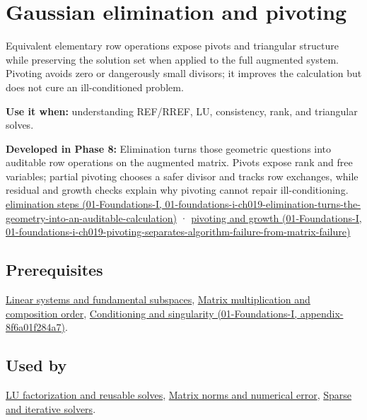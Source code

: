 \hypertarget{appendix-f6e77f4a200f}{}
\section{Gaussian elimination and pivoting}\label{appendix-f6e77f4a200f-gaussian-elimination-and-pivoting}

Equivalent elementary row operations expose pivots and triangular structure while preserving the solution set when applied to the full augmented system. Pivoting avoids zero or dangerously small divisors; it improves the calculation but does not cure an ill-conditioned problem.

\textbf{Use it when:} understanding REF/RREF, LU, consistency, rank, and triangular solves.

\textbf{Developed in Phase 8:} Elimination turns those geometric questions into auditable row operations on the augmented matrix. Pivots expose rank and free variables; partial pivoting chooses a safer divisor and tracks row exchanges, while residual and growth checks explain why pivoting cannot repair ill-conditioning. \href{../01-Foundations-I/main.pdf\#nameddest=01-foundations-i-ch019-elimination-turns-the-geometry-into-an-auditable-calculation}{elimination steps (01-Foundations-I, 01-foundations-i-ch019-elimination-turns-the-geometry-into-an-auditable-calculation)} · \href{../01-Foundations-I/main.pdf\#nameddest=01-foundations-i-ch019-pivoting-separates-algorithm-failure-from-matrix-failure}{pivoting and growth (01-Foundations-I, 01-foundations-i-ch019-pivoting-separates-algorithm-failure-from-matrix-failure)}

\subsection{Prerequisites}\label{appendix-f6e77f4a200f-prerequisites}

\hyperref[appendix-8572a4a060c1]{Linear systems and fundamental subspaces}, \hyperref[appendix-ab31ef447dbf]{Matrix multiplication and composition order}, \href{../01-Foundations-I/main.pdf\#nameddest=appendix-8f6a01f284a7}{Conditioning and singularity (01-Foundations-I, appendix-8f6a01f284a7)}.

\subsection{Used by}\label{appendix-f6e77f4a200f-used-by}

\hyperref[appendix-55e4b5b0a1e6]{LU factorization and reusable solves}, \hyperref[appendix-f8657bac66e5]{Matrix norms and numerical error}, \hyperref[appendix-67c87a3d9e94]{Sparse and iterative solvers}.

